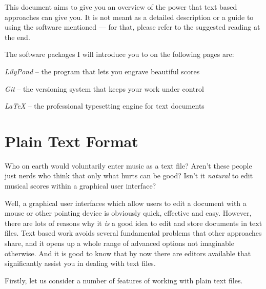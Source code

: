 \documentclass[../../LilyPond-Tutorials]{subfiles}
\begin{document}

This document aims to give you an overview of the
power that text based approaches can give you.
It is not meant as a detailed description or a guide
to using the software mentioned --- for that, please refer
to the suggested reading at the end.

The software packages I will introduce you to on the following
pages are:
\begin{itemize*}
\item \emph{LilyPond} -- the program that lets you engrave
beautiful scores
\item \emph{Git} -- the versioning system that keeps your work
under control
\item \emph{\LaTeX} -- the professional typesetting engine for
text documents
\end{itemize*}

\chapter{Plain Text Format}
\label{chap:pt_plain-text-format}
Who on earth would voluntarily enter music as a text file?
Aren't these people just nerds who think that only what hurts can
be good?
Isn't it \emph{natural} to edit musical scores within a graphical
user interface?

Well, a graphical user interfaces which allow users to edit
a document with a mouse or other pointing device is obviously
quick, effective and easy.
However, there are lots of reasons why it \emph{is} a good idea
to edit and store documents in text files.
Text based work avoids several fundamental problems that other
approaches share, and it opens up a whole range of advanced
options not imaginable otherwise.
And it is good to know that by now there are editors available
that significantly assist you in dealing with text files.

Firstly, let us consider a number of features of working with
plain text files.
\end{document}
